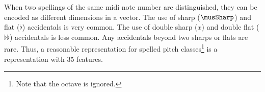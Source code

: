 
When two spellings of the same \gls{midi} note number are
distinguished, they can be encoded as different dimensions
in a vector. The use of sharp ($\musSharp$) and flat ($\flat$)
accidentals is very common. The use of double sharp ($x$)
and double flat ($\flat\flat$) accidentals is less common.
Any accidentals beyond two sharps or flats are rare. Thus, a
reasonable representation for spelled pitch
classes\footnote{Note that the octave is ignored.} is a
representation with 35 features.
